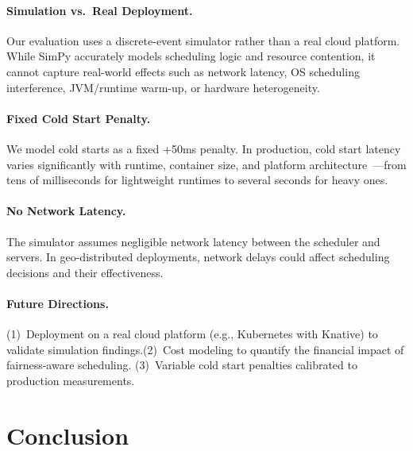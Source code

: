 \documentclass[runningheads]{llncs}
\begin{document}
\paragraph{Simulation vs.\ Real Deployment.}
Our evaluation uses a discrete-event simulator rather than a real cloud platform. While SimPy accurately models scheduling logic and resource contention, it cannot capture real-world effects such as network latency, OS scheduling interference, JVM/runtime warm-up, or hardware heterogeneity.

\paragraph{Fixed Cold Start Penalty.}
We model cold starts as a fixed +50ms penalty. In production, cold start latency varies significantly with runtime, container size, and platform architecture~\cite{wang2018peeking}---from tens of milliseconds for lightweight runtimes to several seconds for heavy ones.

\paragraph{No Network Latency.}
The simulator assumes negligible network latency between the scheduler and servers. In geo-distributed deployments, network delays could affect scheduling decisions and their effectiveness.

\paragraph{Future Directions.}
(1)~Deployment on a real cloud platform (e.g., Kubernetes with Knative) to validate simulation findings.(2)~Cost modeling to quantify the financial impact of fairness-aware scheduling. (3)~Variable cold start penalties calibrated to production measurements.

\section{Conclusion}\label{sec:conclusion}
\end{document}
